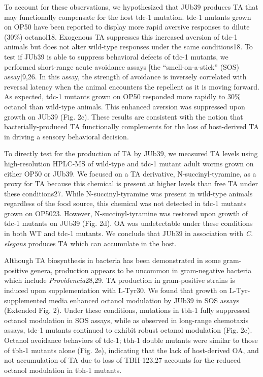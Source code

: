 \documentclass[]{article}
\begin{document}
To account for these observations, we hypothesized that JUb39 produces
TA that may functionally compensate for the host tdc-1 mutation. tdc-1
mutants grown on OP50 have been reported to display more rapid aversive
responses to dilute (30\%) octanol18. Exogenous TA suppresses this
increased aversion of tdc-1 animals but does not alter wild-type
responses under the same conditions18. To test if JUb39 is able to
suppress behavioral defects of tdc-1 mutants, we performed short-range
acute avoidance assays {[}the ``smell-on-a-stick'' (SOS) assay{]}9,26.
In this assay, the strength of avoidance is inversely correlated with
reversal latency when the animal encounters the repellent as it is
moving forward. As expected, tdc-1 mutants grown on OP50 responded more
rapidly to 30\% octanol than wild-type animals. This enhanced aversion
was suppressed upon growth on JUb39 (Fig. 2c). These results are
consistent with the notion that bacterially-produced TA functionally
complements for the loss of host-derived TA in driving a sensory
behavioral decision.

To directly test for the production of TA by JUb39, we measured TA
levels using high-resolution HPLC-MS of wild-type and tdc-1 mutant adult
worms grown on either OP50 or JUb39. We focused on a TA derivative,
N-succinyl-tyramine, as a proxy for TA because this chemical is present
at higher levels than free TA under these conditions27. While
N-succinyl-tyramine was present in wild-type animals regardless of the
food source, this chemical was not detected in tdc-1 mutants grown on
OP5023. However, N-succinyl-tyramine was restored upon growth of tdc-1
mutants on JUb39 (Fig. 2d). OA was undetectable under these conditions
in both WT and tdc-1 mutants. We conclude that JUb39 in association with
\textit{C. elegans} produces TA which can accumulate in the host.

Although TA biosynthesis in bacteria has been demonstrated in some
gram-positive genera, production appears to be uncommon in gram-negative
bacteria which include \textit{Providencia}28,29. TA production in
gram-positive strains is induced upon supplementation with L-Tyr30. We
found that growth on L-Tyr-supplemented media enhanced octanol
modulation by JUb39 in SOS assays (Extended Fig. 2). Under these
conditions, mutations in tbh-1 fully suppressed octanol modulation in
SOS assays, while as observed in long-range chemotaxis assays, tdc-1
mutants continued to exhibit robust octanol modulation (Fig. 2e).
Octanol avoidance behaviors of tdc-1; tbh-1 double mutants were similar
to those of tbh-1 mutants alone (Fig. 2e), indicating that the lack of
host-derived OA, and not accumulation of TA due to loss of TBH-123,27
accounts for the reduced octanol modulation in tbh-1 mutants.
\end{document}
